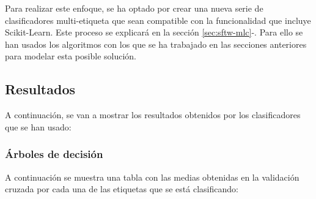 Para realizar este enfoque, se ha optado por crear una nueva serie de clasificadores multi-etiqueta que sean compatible con la funcionalidad que incluye Scikit-Learn. Este proceso se explicará en la sección \ref{sec:sftw-mlc}-. Para ello se han usados los algoritmos con los que se ha trabajado en las secciones anteriores para modelar esta posible solución.
\subsection{Resultados}
A continuación, se van a mostrar los resultados obtenidos por los clasificadores que se han usado:
\subsubsection*{Árboles de decisión}
A continuación se muestra una tabla con las medias obtenidas en la validación cruzada por cada una de las etiquetas que se está clasificando:
